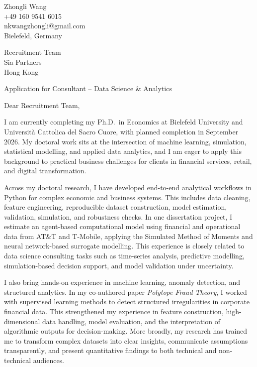 \documentclass[11pt]{article}
\begin{document}
\begin{flushright}
Zhongli Wang \\
+49 160 9541 6015 \\
nkwangzhongli@gmail.com \\
Bielefeld, Germany \\
\end{flushright}

\vspace{0.1cm}

\noindent
Recruitment Team \\
Sia Partners \\
Hong Kong \\

\vspace{0.1cm}

\noindent
Application for Consultant -- Data Science \& Analytics \\

\vspace{0.05cm}

\noindent Dear Recruitment Team,

I am currently completing my Ph.D.\ in Economics at Bielefeld University and Universit\`a Cattolica del Sacro Cuore, with planned completion in September 2026. My doctoral work sits at the intersection of machine learning, simulation, statistical modelling, and applied data analytics, and I am eager to apply this background to practical business challenges for clients in financial services, retail, and digital transformation.

Across my doctoral research, I have developed end-to-end analytical workflows in Python for complex economic and business systems. This includes data cleaning, feature engineering, reproducible dataset construction, model estimation, validation, simulation, and robustness checks. In one dissertation project, I estimate an agent-based computational model using financial and operational data from AT\&T and T-Mobile, applying the Simulated Method of Moments and neural network-based surrogate modelling. This experience is closely related to data science consulting tasks such as time-series analysis, predictive modelling, simulation-based decision support, and model validation under uncertainty.

I also bring hands-on experience in machine learning, anomaly detection, and structured analytics. In my co-authored paper \emph{Polytope Fraud Theory}, I worked with supervised learning methods to detect structured irregularities in corporate financial data. This strengthened my experience in feature construction, high-dimensional data handling, model evaluation, and the interpretation of algorithmic outputs for decision-making. More broadly, my research has trained me to transform complex datasets into clear insights, communicate assumptions transparently, and present quantitative findings to both technical and non-technical audiences.
\end{document}
